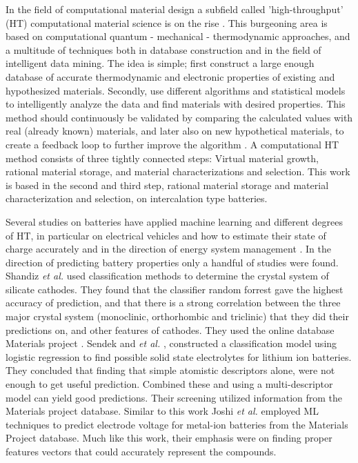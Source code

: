 In the field of computational material design a subfield called 'high-throughput' (\ac{HT}) computational material science is on the rise \cite{potyrailo2011combinatorial} \cite{pang2020additive}. This burgeoning area is based on computational quantum - mechanical - thermodynamic approaches, and a multitude of techniques both in database construction and in the field of intelligent data mining. The idea is simple; first construct a large enough database of accurate thermodynamic and electronic properties of existing and hypothesized materials. Secondly, use different algorithms and statistical models to intelligently analyze the data and find materials with desired properties. This method should continuously be validated by comparing the calculated values with real  (already known) materials, and later also on new hypothetical materials, to create a feedback loop to further improve the algorithm \cite{curtarolo2013high}. A computational HT method consists of three tightly connected steps: Virtual material growth, rational material storage, and material characterizations and selection. This work is based in the second and third step, rational material storage and material characterization and selection, on intercalation type batteries.

Several studies on batteries have applied machine learning and different degrees of HT, in particular on electrical vehicles and how to estimate their state of charge accurately and in the direction of energy system management  \cite{kalawoun2015novel} \cite{chemali2018state} \cite{hu2015battery} \cite{ermon2013learning}.
	In the direction of predicting battery properties only a handful of studies were found. Shandiz \textit{et al.} \cite{shandiz2016application} used classification methods to determine the crystal system of silicate cathodes. They found that the classifier random forrest gave the highest accuracy of prediction, and that there is a strong correlation between the three major crystal system (monoclinic, orthorhombic and triclinic) that they did their predictions on, and other features of cathodes. They used the online database Materials project \cite{Jain2013} \cite{Zhou2004a} \cite{Adams2011a}.
	Sendek and \textit{et al.} \cite{sendek2017holistic}, constructed a classification model using logistic regression to find possible solid state electrolytes for lithium ion batteries. They concluded that finding that simple atomistic descriptors alone, were not enough to get useful prediction. Combined these and using a multi-descriptor model can yield good predictions. Their screening utilized information from the Materials project database.
	Similar to this work Joshi \textit{et al.} \cite{joshi2019machine} employed ML techniques to predict electrode voltage for metal-ion batteries from the Materials Project database. Much like this work, their emphasis were on finding proper features vectors that could accurately represent the compounds.

